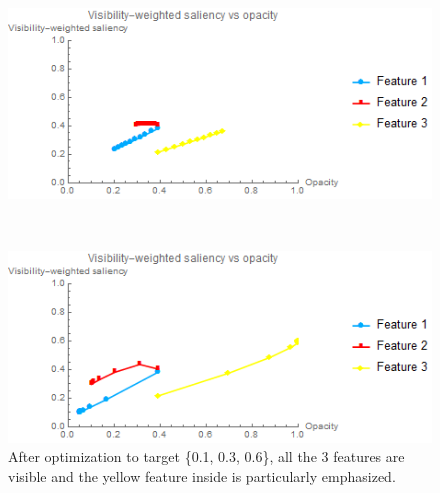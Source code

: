 \begin{figure}
	\begin{minipage}{.49\textwidth}
		\includegraphics[width=1\linewidth]{images/tooth_naive_saliencyopacity_fixed}
		\subcaption{}
	\end{minipage}~
	\begin{minipage}{.49\textwidth}
		\includegraphics[width=1\linewidth]{images/tooth_naive_saliencyopacity_parallelsearch}
		\subcaption{}
	\end{minipage}
	\caption{After optimization to target \{0.1, 0.3, 0.6\}, all the 3 features are visible and the yellow feature inside is particularly emphasized.}
	\label{fig:tooth_naive_optimized}
\end{figure}

